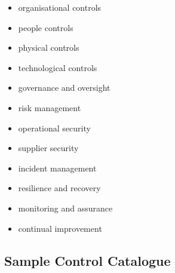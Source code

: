 \documentclass[
  letterpaper,
  DIV=11,
  numbers=noendperiod]{scrartcl}
\providecommand{\tightlist}{%
  \setlength{\itemsep}{0pt}\setlength{\parskip}{0pt}}
\begin{document}
\begin{itemize}
\tightlist
\item
  organisational controls
\item
  people controls
\item
  physical controls
\item
  technological controls
\item
  governance and oversight
\item
  risk management
\item
  operational security
\item
  supplier security
\item
  incident management
\item
  resilience and recovery
\item
  monitoring and assurance
\item
  continual improvement
\end{itemize}

\subsection{Sample Control Catalogue}\label{sample-control-catalogue}
\end{document}
